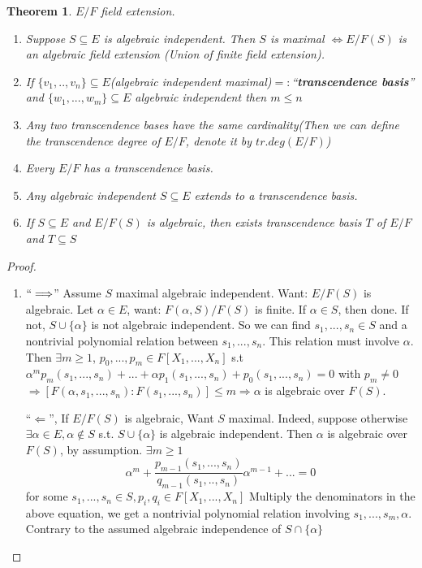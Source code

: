 \documentclass[11pt]{article}
\newtheorem{thm}{Theorem}[section]
\newcommand{\Lrta}{\Longrightarrow}
\newcommand{\Llta}{\Longleftarrow}
\newcommand{\Llrta}{\Longleftrightarrow}
\begin{document}
\begin{thm}\label{thm:field_extension}
$E/F$ field extension. 
\begin{enumerate}[label=(\alph*)]
\item Suppose $S\subseteq E$ is algebraic independent. Then $S$ is maximal $\Llrta E/F(S)$ is an algebraic field extension (Union of finite field extension).
\item If $\{v_1,..,v_n\}\subseteq E$(algebraic independent maximal)$=:$``\textbf{transcendence basis}'' and $\{w_1,...,w_m\}\subseteq E$ algebraic independent then $m\leq n$
\item Any two transcendence bases have the same cardinality(Then we can define the transcendence degree of $E/F$, denote it by $tr.deg(E/F)$)
\item Every $E/F$ has a transcendence basis.
\item Any algebraic independent $S\subseteq E$ extends to a transcendence basis.
\item If $S\subseteq E$ and $E/F(S)$ is algebraic, then exists transcendence basis $T$ of $E/F$ and $T\subseteq S$
\end{enumerate}
\end{thm}
\begin{proof}
\begin{enumerate}[label=(\alph*)]
\item $``\Lrta$'' Assume $S$ maximal algebraic independent. Want: $E/F(S)$ is algebraic. Let $\alpha\in E$, want: $F(\alpha,S)/F(S)$ is finite. If $\alpha\in S$, then done. If not, $S\cup \{\alpha\}$ is not algebraic independent. So we can find $s_1,...,s_n\in S$ and a nontrivial polynomial relation between $s_1,...,s_n$. This relation must involve $\alpha$. Then $\exists m\geq 1$, $p_0,...,p_m\in F[X_1,...,X_n]$ s.t $\alpha^m p_m(s_1,...,s_n)+...+\alpha p_1(s_1,...,s_n)+p_0(s_1,...,s_n)=0$ with $p_m\neq 0$ $\Lrta [F(\alpha, s_1,...,s_n):F(s_1,...,s_n)]\leq m\Lrta \alpha$ is algebraic over $F(S)$.
 
 ``$\Llta$'', If $E/F(S)$ is algebraic, Want $S$ maximal. Indeed, suppose otherwise $\exists \alpha\in E, \alpha\notin S$ s.t. $S\cup \{\alpha\}$ is algebraic independent. Then $\alpha$ is algebraic over $F(S)$, by assumption. $\exists m\geq 1$
 $$
\alpha^m+\frac{p_{m-1}(s_1,...,s_n)}{q_{m-1}(s_1,..,s_n)}\alpha^{m-1}+...=0
 $$
 for some $s_1,...,s_n\in S, p_i,q_i\in F[X_1,...,X_n]$ Multiply the denominators in the above equation, we get a nontrivial polynomial relation involving $s_1,...,s_m,\alpha$. Contrary to the assumed algebraic independence of $S\cap\{\alpha\}$
\end{enumerate}
\end{proof}
\end{document}
